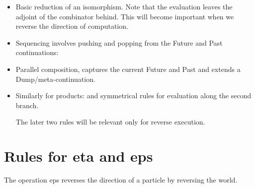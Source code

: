 \documentclass[preprint]{sigplanconf}
\begin{document}
\begin{itemize}
\item 
Basic reduction of an isomorphism. Note that the evaluation leaves the
adjoint of the combinator behind. This will become important when we
reverse the direction of computation.

\item
Sequencing involves pushing and popping from the Future and Past
continuations:


\item
Parallel composition, captures the current Future and Past and extends
a Dump/meta-continuation.


\item
Similarly for products:
and symmetrical rules for evaluation along the second branch. 

The later two rules will be relevant only for reverse execution. 

\end{itemize}


\section{Rules for {{eta}} and {{eps}} }

The operation {{eps}} reverses the direction of a particle by reversing the world. 
\end{document}
